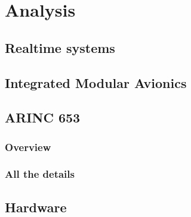 \chapter{Analysis}


\section{Realtime systems}

\section{Integrated Modular Avionics}


\section{ARINC 653}
\subsection{Overview}


\subsection{All the details}

\section{Hardware}


\section{}
